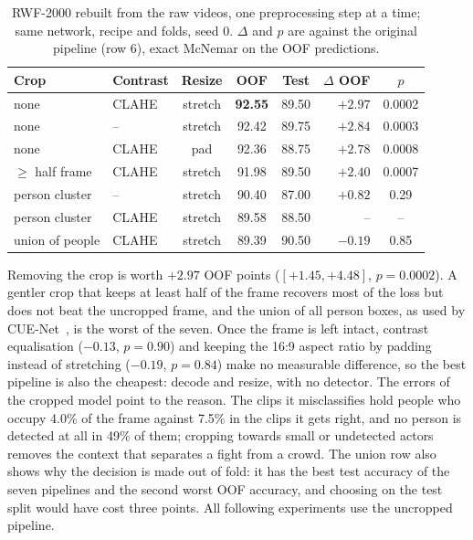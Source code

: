 \documentclass[runningheads]{llncs}
\begin{document}
\begin{table}[t]
\centering
\caption{RWF-2000 rebuilt from the raw videos, one preprocessing step at a
time; same network, recipe and folds, seed 0. $\Delta$ and $p$ are against
the original pipeline (row 6), exact McNemar on the OOF predictions.}
\label{tab:pipeline}
\setlength{\tabcolsep}{5pt}
\begin{tabular}{llcccrc}
\toprule
Crop & Contrast & Resize & OOF & Test & $\Delta$ OOF & $p$ \\
\midrule
none              & CLAHE & stretch & \textbf{92.55} & 89.50 & $+2.97$ & 0.0002 \\
none              & --    & stretch & 92.42 & 89.75 & $+2.84$ & 0.0003 \\
none              & CLAHE & pad     & 92.36 & 88.75 & $+2.78$ & 0.0008 \\
$\geq$ half frame & CLAHE & stretch & 91.98 & 89.50 & $+2.40$ & 0.0007 \\
person cluster    & --    & stretch & 90.40 & 87.00 & $+0.82$ & 0.29 \\
person cluster    & CLAHE & stretch & 89.58 & 88.50 & --      & --   \\
union of people   & CLAHE & stretch & 89.39 & 90.50 & $-0.19$ & 0.85 \\
\bottomrule
\end{tabular}
\end{table}

Removing the crop is worth $+2.97$ OOF points ($[+1.45, +4.48]$,
$p=0.0002$). A gentler crop that keeps at least half of the frame recovers
most of the loss but does not beat the uncropped frame, and the union of all
person boxes, as used by CUE-Net~\cite{cuenet}, is the worst of the seven.
Once the frame is left intact, contrast equalisation ($-0.13$, $p=0.90$)
and keeping the 16:9 aspect ratio by padding instead of stretching
($-0.19$, $p=0.84$) make no measurable difference, so the best pipeline is
also the cheapest: decode and resize, with no detector. The errors of the
cropped model point to the reason. The clips it misclassifies hold people
who occupy 4.0\% of the frame against 7.5\% in the clips it gets right, and
no person is detected at all in 49\% of them; cropping towards small or
undetected actors removes the context that separates a fight from a crowd.
The union row also shows why the decision is made out of fold: it has the
best test accuracy of the seven pipelines and the second worst OOF
accuracy, and choosing on the test split would have cost three points.
All following experiments use the uncropped pipeline.
\end{document}
